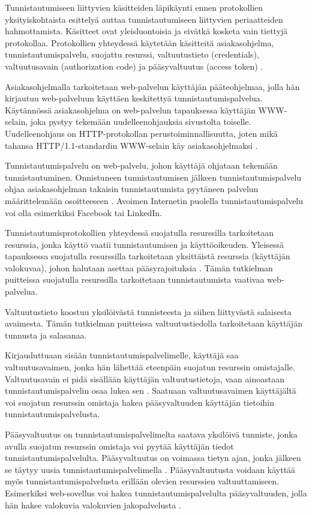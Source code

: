 Tunnistautumiseen liittyvien käsitteiden läpikäynti ennen protokollien yksityiskohtaista esittelyä auttaa tunnistautumiseen liittyvien periaatteiden hahmottamista. Käsitteet ovat yleisluontoisia ja eivätkä kosketa vain tiettyjä protokollaa. Protokollien yhteydessä käytetään käsitteitä asiakasohjelma, tunnistautumispalvelu, suojattu resurssi, valtuutustieto (credentials), valtuutusavain (authorization code) ja pääsyvaltuutus (access token) \cite{nisti}.

Asiakasohjelmalla tarkoitetaan web-palvelun käyttäjän pääteohjelmaa, jolla hän kirjautuu web-palveluun käyttäen keskitettyä tunnistautumispalvelua. Käytännössä asiakasohjelma on web-palvelun tapauksessa käyttäjän WWW-selain, joka pystyy tekemään uudelleenohjauksia sivustolta toiselle. Uudelleenohjaus on HTTP-protokollan perustoiminnallisuutta, joten mikä tahansa HTTP/1.1-standardin WWW-selain käy asiakasohjelmaksi \cite{rfc2616}.

Tunnistautumispalvelu on web-palvelu, johon käyttäjä ohjataan tekemään tunnistautuminen. Onnistuneen tunnistautumisen jälkeen tunnistautumispalvelu ohjaa asi\-a\-kas\-oh\-jel\-man takaisin tunnistautumista pyytäneen palvelun määrittelemään osoitteeseen \cite{nisti}. Avoimen Internetin puolella tunnistautumispalvelu voi olla esimerkiksi Facebook tai LinkedIn.

Tunnistautumisprotokollien yhteydessä suojatulla resurssilla tarkoitetaan resurssia, jonka käyttö vaatii tunnistautumisen ja käyttöoikeuden. Yleisessä tapauksessa suojatulla resurssilla tarkoitetaan yksittäistä resurssia (käyttäjän valokuvaa), johon halutaan asettaa pääsyrajoituksia \cite{nisti}. Tämän tutkielman puitteissa suojatulla resurssilla tarkoitetaan tunnistautumista vaativaa web-palvelua.

Valtuutustieto koostuu yksilöivästä tunnisteesta ja siihen liittyvästä salaisesta avaimesta. Tämän tutkielman puitteissa valtuutustiedolla tarkoitetaan käyttäjän tunnusta ja salasanaa.

Kirjauduttuaan sisään tunnistautumispalvelimelle, käyttäjä saa valtuutusavaimen, jonka hän lähettää eteenpäin suojatun resurssin omistajalle. Valtuutusavain ei pidä sisällään käyttäjän valtuutustietoja, vaan ainoastaan tunnistautumispalvelin osaa lukea sen \cite{nisti}. Saatuaan valtuutusavaimen käyttäjältä voi suojatun resurssin omistaja hakea pääsyvaltuuden käyttäjän tietoihin tunnistautumispalvelusta.

Pääsyvaltuutus on tunnistautumispalvelimelta saatava yksilöivä tunniste, jonka avulla suojatun resurssin omistaja voi pyytää käyttäjän tiedot tunnistautumispalvelulta. Pääsyvaltuutus on voimassa tietyn ajan, jonka jälkeen se täytyy uusia tunnistautumispalvelimella \cite{nisti}. Pääsyvaltuutusta voidaan käyttää myös tunnistautumispalvelusta erillään olevien resurssien valtuuttamiseen. Esimerkiksi web-sovellus voi hakea tunnistautumispalvelulta pääsyvaltuuden, jolla hän hakee valokuvia valokuvien jakopalvelusta \cite{facebook}.